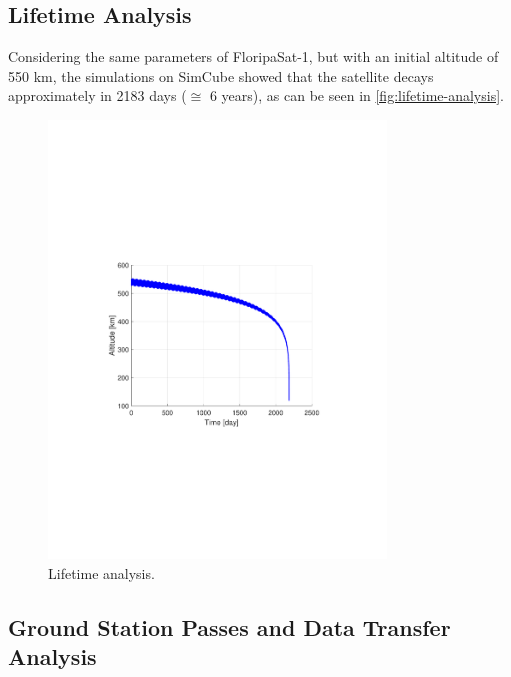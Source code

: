 
\subsection{Lifetime Analysis}

Considering the same parameters of FloripaSat-1, but with an initial altitude of 550 km, the simulations on SimCube showed that the satellite decays approximately in 2183 days ($\cong$ 6 years), as can be seen in \autoref{fig:lifetime-analysis}.

\begin{figure}[!ht]
    \begin{center}
        \includegraphics[trim=3.5cm 8cm 4.0cm 8cm,clip, width=0.8\textwidth]{curves/Altitude.pdf}
        \caption{Lifetime analysis.}
        \label{fig:lifetime-analysis}
    \end{center}
\end{figure}

\subsection{Ground Station Passes and Data Transfer Analysis}

